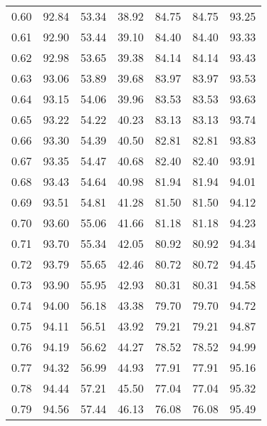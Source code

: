 \begin{tabular}{|c|c|c|c|c|c|c|}
      0.60 &     92.84 &     53.34 &      38.92 &   84.75 &      84.75 &         93.25 \\
      0.61 &     92.90 &     53.44 &      39.10 &   84.40 &      84.40 &         93.33 \\
      0.62 &     92.98 &     53.65 &      39.38 &   84.14 &      84.14 &         93.43 \\
      0.63 &     93.06 &     53.89 &      39.68 &   83.97 &      83.97 &         93.53 \\
      0.64 &     93.15 &     54.06 &      39.96 &   83.53 &      83.53 &         93.63 \\
      0.65 &     93.22 &     54.22 &      40.23 &   83.13 &      83.13 &         93.74 \\
      0.66 &     93.30 &     54.39 &      40.50 &   82.81 &      82.81 &         93.83 \\
      0.67 &     93.35 &     54.47 &      40.68 &   82.40 &      82.40 &         93.91 \\
      0.68 &     93.43 &     54.64 &      40.98 &   81.94 &      81.94 &         94.01 \\
      0.69 &     93.51 &     54.81 &      41.28 &   81.50 &      81.50 &         94.12 \\
      0.70 &     93.60 &     55.06 &      41.66 &   81.18 &      81.18 &         94.23 \\
      0.71 &     93.70 &     55.34 &      42.05 &   80.92 &      80.92 &         94.34 \\
      0.72 &     93.79 &     55.65 &      42.46 &   80.72 &      80.72 &         94.45 \\
      0.73 &     93.90 &     55.95 &      42.93 &   80.31 &      80.31 &         94.58 \\
      0.74 &     94.00 &     56.18 &      43.38 &   79.70 &      79.70 &         94.72 \\
      0.75 &     94.11 &     56.51 &      43.92 &   79.21 &      79.21 &         94.87 \\
      0.76 &     94.19 &     56.62 &      44.27 &   78.52 &      78.52 &         94.99 \\
      0.77 &     94.32 &     56.99 &      44.93 &   77.91 &      77.91 &         95.16 \\
      0.78 &     94.44 &     57.21 &      45.50 &   77.04 &      77.04 &         95.32 \\
      0.79 &     94.56 &     57.44 &      46.13 &   76.08 &      76.08 &         95.49 \\

\end{tabular}
